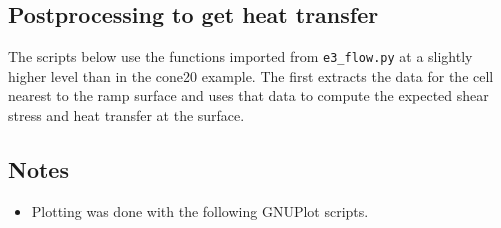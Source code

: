 \bigskip
\subsection{Postprocessing to get heat transfer}
\label{convex-ramp-noneq-post-processing}
%
The scripts below use the functions imported from \verb!e3_flow.py!
at a slightly higher level than in the cone20 example.
The first extracts the data for the cell nearest to the ramp surface
and uses that data to compute the expected shear stress and heat transfer at the surface.

\noindent
\topbar

\bottombar

\subsection{Notes}
\begin{itemize}
 \item Plotting was done with the following GNUPlot scripts.
 
 
\end{itemize}

